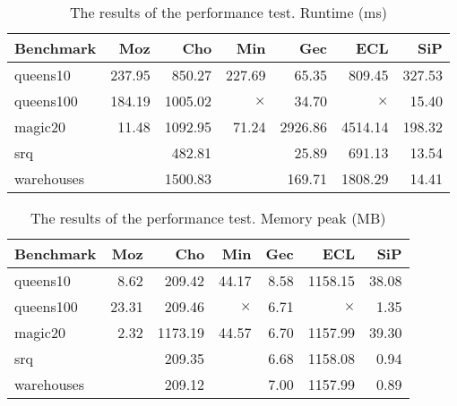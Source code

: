\begin{table}
\caption{\label{results:performance:runtime}The results of the performance test. Runtime (ms)}
\begin{center}
\begin{tabular}{lrrrrrr}
\hline Benchmark & Moz & Cho & Min & Gec & ECL & SiP \\
\hline queens10 & 237.95 & 850.27 & 227.69 & 65.35 & 809.45 & 327.53 \\
	queens100 & 184.19 & 1005.02 & $\times$ & 34.70 & $\times$ & 15.40 \\
	magic20 & 11.48 & 1092.95 & 71.24 & 2926.86 & 4514.14 & 198.32 \\
	srq & & 482.81 & & 25.89 & 691.13 & 13.54 \\
	warehouses &  & 1500.83 & & 169.71 & 1808.29 & 14.41 \\  
\hline 
\end{tabular}
\end{center}
\end{table}

\begin{table}
\caption{\label{results:performance:runtime}The results of the performance test. Memory peak (MB)}
\begin{center}
\begin{tabular}{lrrrrrr}
\hline Benchmark & Moz & Cho & Min & Gec & ECL & SiP \\
\hline 	queens10 & 8.62 & 209.42 & 44.17 & 8.58 & 1158.15 & 38.08 \\
				queens100 & 23.31 & 209.46 & $\times$ & 6.71 & $\times$ & 1.35 \\
				magic20 & 2.32 & 1173.19 & 44.57 & 6.70 & 1157.99 & 39.30 \\
				srq & & 209.35 & & 6.68 & 1158.08 & 0.94 \\
				warehouses &  & 209.12 & & 7.00 & 1157.99 & 0.89 \\
\hline
\end{tabular}
\end{center}
\end{table}
